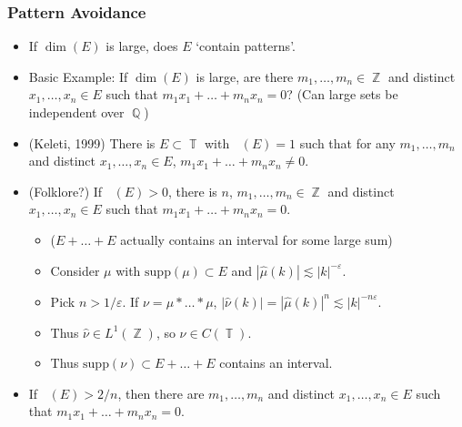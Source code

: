 \documentclass[usenames,dvipsnames]{beamer}
\DeclareMathOperator{\QQ}{\mathbb{Q}}
\DeclareMathOperator{\ZZ}{\mathbb{Z}}
\DeclareMathOperator{\TT}{\mathbb{T}}
\DeclareMathOperator{\fordim}{\text{dim}_{\mathbb{F}}}
\DeclareMathOperator{\hausdim}{\text{dim}_{\mathbb{H}}}
\begin{document}
\begin{frame}
    \frametitle{Pattern Avoidance}

    \begin{itemize}
        \item If $\dim(E)$ is large, does $E$ `contain patterns'.

        \pause
        \item Basic Example: If $\dim(E)$ is large, are there $m_1,\dots,m_n \in \ZZ$ and distinct $x_1,\dots,x_n \in E$ such that $m_1x_1 + \dots + m_nx_n = 0$? (Can large sets be independent over $\QQ$)

        \pause
        \item (Keleti, 1999) There is $E \subset \TT$ with $\hausdim(E) = 1$ such that for any $m_1,\dots,m_n$ and distinct $x_1,\dots,x_n \in E$, $m_1x_1 + \dots + m_nx_n \neq 0$.

        \pause
        \item (Folklore?) If $\fordim(E) > 0$, there is $n$, $m_1,\dots,m_n \in \ZZ$ and distinct $x_1,\dots,x_n \in E$ such that $m_1x_1 + \dots + m_nx_n = 0$.

        \begin{itemize}
            \pause
            \item ($E + \dots + E$ actually contains an interval for some large sum)
            
            \pause
            \item Consider $\mu$ with $\text{supp}(\mu) \subset E$ and $|\widehat{\mu}(k)| \lesssim |k|^{-\varepsilon}$.
            
            \pause
            \item Pick $n > 1/\varepsilon$. If $\nu = \mu * \dots * \mu$, $|\widehat{\nu}(k)| = |\widehat{\mu}(k)|^n \lesssim |k|^{-n\varepsilon}$.
            
            \pause
            \item Thus $\widehat{\nu} \in L^1(\ZZ)$, so $\nu \in C(\TT)$.
            
            \pause
            \item Thus $\text{supp}(\nu) \subset E + \dots + E$ contains an interval.
        \end{itemize}

        \pause
        \item If $\fordim(E) > 2/n$, then there are $m_1,\dots,m_n$ and distinct $x_1,\dots,x_n \in E$ such that $m_1x_1 + \dots + m_nx_n = 0$.
    \end{itemize}
\end{frame}
\end{document}
